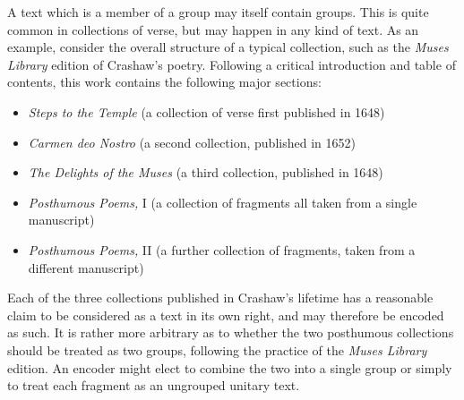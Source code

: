 A text which is a member of a group may itself contain groups. This is quite common in collections of verse, but may happen in any kind of text. As an example, consider the overall structure of a typical collection, such as the \textit{Muses Library} edition of Crashaw's poetry. Following a critical introduction and table of contents, this work contains the following major sections: \begin{itemize}
\item \textit{Steps to the Temple} (a collection of verse first published in 1648)
\item \textit{Carmen deo Nostro} (a second collection, published in 1652)
\item \textit{The Delights of the Muses} (a third collection, published in 1648)
\item \textit{Posthumous Poems,} I (a collection of fragments all taken from a single manuscript)
\item \textit{Posthumous Poems,} II (a further collection of fragments, taken from a different manuscript)
\end{itemize} \par
Each of the three collections published in Crashaw's lifetime has a reasonable claim to be considered as a text in its own right, and may therefore be encoded as such. It is rather more arbitrary as to whether the two posthumous collections should be treated as two groups, following the practice of the \textit{Muses Library} edition. An encoder might elect to combine the two into a single group or simply to treat each fragment as an ungrouped unitary text.\par
